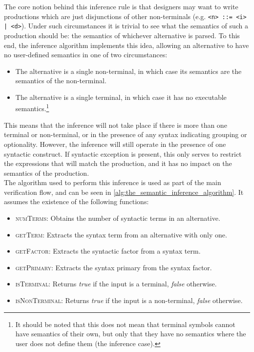 The core notion behind this inference rule is that designers may want to write productions which are just disjunctions of other non-terminals (e.g. \texttt{<n> ::= <i> | <d>}).
Under such circumstances it is trivial to see what the semantics of such a production should be: the semantics of whichever alternative is parsed. 
To this end, the inference algorithm implements this idea, allowing an alternative to have no user-defined semantics in one of two circumstances:
\begin{itemize}
    \item The alternative is a single non-terminal, in which case its semantics are the semantics of the non-terminal.
    \item The alternative is a single terminal, in which case it has no executable semantics.\footnote{It should be noted that this does not mean that terminal symbols cannot have semantics of their own, but only that they have no semantics where the user does not define them (the inference case).}  
\end{itemize}

This means that the inference will not take place if there is more than one terminal or non-terminal, or in the presence of any syntax indicating grouping or optionality. 
However, the inference will still operate in the presence of one syntactic construct.
If syntactic exception is present, this only serves to restrict the expressions that will match the production, and it has no impact on the semantics of the production.\\

The algorithm used to perform this inference is used as part of the main verification flow, and can be seen in \autoref{alg:the_semantic_inference_algorithm}.
It assumes the existence of the following functions:
\begin{itemize}
    \item \textsc{numTerms}: Obtains the number of syntactic terms in an alternative. 
    \item \textsc{getTerm}: Extracts the syntax term from an alternative with only one.
    \item \textsc{getFactor}: Extracts the syntactic factor from a syntax term.
    \item \textsc{getPrimary}: Extracts the syntax primary from the syntax factor.
    \item \textsc{isTerminal}: Returns \textit{true} if the input is a terminal, \textit{false} otherwise.
    \item \textsc{isNonTerminal}: Returns \textit{true} if the input is a non-terminal, \textit{false} otherwise.
\end{itemize}

